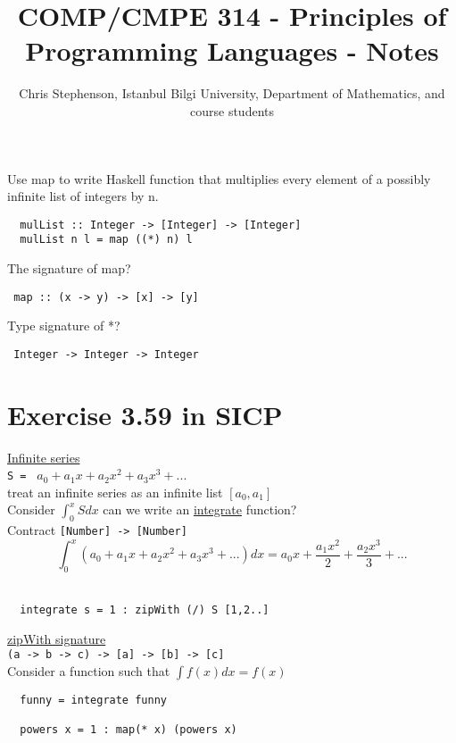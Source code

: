\documentclass{article}
\begin{document}
\title{COMP/CMPE 314 - Principles of Programming Languages - Notes}
\author{Chris Stephenson, Istanbul Bilgi University, Department of Mathematics, and course students}
\maketitle

\begin{flushleft}
 Use map to write Haskell function that multiplies every element of a possibly infinite list of integers by n.\\
 \begin{verbatim}
  mulList :: Integer -> [Integer] -> [Integer]
  mulList n l = map ((*) n) l
 \end{verbatim}
The signature of map?\\
\begin{verbatim}
 map :: (x -> y) -> [x] -> [y]
\end{verbatim}
Type signature of *?
\begin{verbatim}
 Integer -> Integer -> Integer
\end{verbatim}
\end{flushleft}
\section*{Exercise 3.59 in SICP}
\begin{flushleft}
 \underline{Infinite series}\\
 \verb|S = |  $a_0 + a_1x + a_2x^2 + a_3x^3 + ... $\\
 treat an infinite series as an infinite list $[a_0, a_1]$\\
 \bigskip
 Consider $\int_{0}^{x} Sdx$ can we write an \underline{integrate} function?\\
 \bigskip
 Contract \verb|[Number] -> [Number]|\\
 $$\int_{0}^{x} (a_0 + a_1x + a_2x^2 + a_3x^3 + ...) dx = a_0x + \frac{a_1x^2}{2} + \frac{a_2x^3}{3} + ...$$\\
 \begin{verbatim}
  integrate s = 1 : zipWith (/) S [1,2..]
 \end{verbatim}
 \underline{zipWith signature}\\
 \verb|(a -> b -> c) -> [a] -> [b] -> [c]|\\
 \bigskip
 Consider a function such that $\int f(x)dx = f(x)$\\
 \begin{verbatim}
  funny = integrate funny
  
  powers x = 1 : map(* x) (powers x)
 \end{verbatim}
\end{flushleft}
\pagebreak
\end{document}
